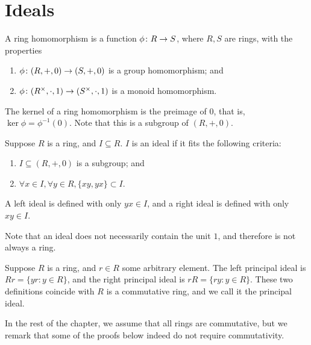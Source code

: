 \section{Ideals}

\begin{definition}
    A ring homomorphism is a function \(\phi\colon R\to S\),
    where \(R,S\) are rings,
    with the properties
    \begin{enumerate}[label={(\roman*)}, itemsep=0mm]
        \item \(\phi\colon(R,+,0)\to(S,+,0)\) is a group homomorphism; and
        \item \(\phi\colon(R^\times,\cdot,1)\to(S^\times,\cdot,1)\)
            is a monoid homomorphism.
    \end{enumerate}
\end{definition}
\begin{definition}
    The kernel of a ring homomorphism
    is the preimage of \(0\),
    that is, \(\ker\phi = \phi^{-1}(0)\).
    Note that this is a subgroup of \((R,+,0)\).
\end{definition}

\begin{definition}
    Suppose \(R\) is a ring, and \(I \subseteq R\).
    \(I\) is an ideal if it fits the following criteria:
    \begin{enumerate}[label={(\roman*)}, itemsep=0mm]
        \item \(I \subseteq (R,+,0)\) is a subgroup; and
        \item \(\forall x \in I, \forall y \in R, \{xy,yx\} \subset I\).
    \end{enumerate}
    A left ideal is defined with only \(yx \in I\),
    and a right ideal is defined with only \(xy \in I\).
\end{definition}
\begin{remark}
    Note that an ideal does not necessarily contain the unit \(1\),
    and therefore is not always a ring.
\end{remark}

\begin{definition}
    Suppose \(R\) is a ring, and \(r \in R\) some arbitrary element.
    The left principal ideal is \(Rr = \{yr : y \in R\}\),
    and the right principal ideal is \(rR = \{ry : y \in R\}\).
    These two definitions coincide with \(R\) is a commutative ring,
    and we call it the principal ideal.
\end{definition}
\begin{remark}
    In the rest of the chapter, we assume that all rings are commutative,
    but we remark that some of the proofs below indeed do not require commutativity.
\end{remark}

